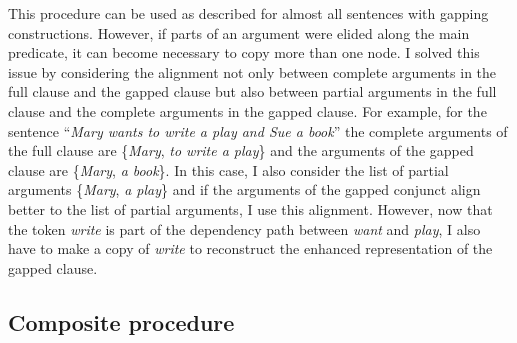 \documentclass[lucida,biblatex]{sp} %
\begin{document}
This procedure can be used as described for almost all sentences with gapping constructions. However, if parts of an argument were elided along the main predicate, it can become necessary to copy more than one node. I solved this issue by considering the alignment not only between complete arguments in the full clause and the gapped clause but also between partial arguments in the full clause and the complete arguments in the gapped clause. For example, for the sentence ``{\it Mary wants to write a play and Sue a book}'' the complete arguments of the full clause are \{{\it Mary}, {\it to write a play}\} and   the arguments of the gapped clause are \{{\it Mary}, {\it a book}\}. In this case, I also consider the list of partial arguments  \{{\it Mary}, {\it a play}\} and if the arguments of the gapped conjunct align better to the list of partial arguments, I use this alignment. However, now that the token {\it write} is part of the dependency path between {\it want} and {\it play}, I also have to make a copy of {\it write} to reconstruct the enhanced representation of the gapped clause.

\subsection{Composite procedure}

% 
% 
%
% 
%
%
\end{document}
